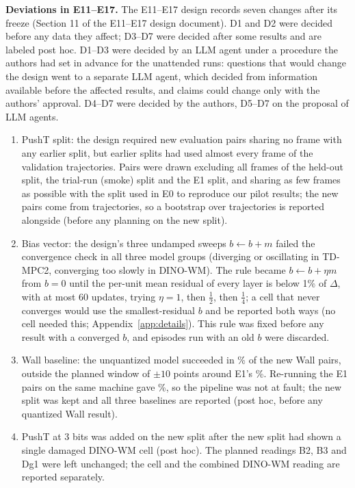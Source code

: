 \textbf{Deviations in E11--E17.} The E11--E17 design records seven changes after its freeze (Section 11 of the E11--E17 design document). D1 and D2 were decided before any data they affect; D3--D7 were decided after some results and are labeled post hoc. D1--D3 were decided by an LLM agent under a procedure the authors had set in advance for the unattended runs: questions that would change the design went to a separate LLM agent, which decided from information available before the affected results, and claims could change only with the authors' approval. D4--D7 were decided by the authors, D5--D7 on the proposal of LLM agents.
\begin{enumerate}\setlength{\itemsep}{0pt}\setlength{\parskip}{0pt}
\item[D1.] PushT split: the design required new evaluation pairs sharing no frame with any earlier split, but earlier splits had used almost every frame of the validation trajectories. Pairs were drawn excluding all frames of the held-out split, the trial-run (smoke) split and the E1 split, and sharing as few frames as possible with the split used in E0 to reproduce our pilot results; the new pairs come from  trajectories, so a bootstrap over trajectories is reported alongside (before any planning on the new split).
\item[D2.] Bias vector: the design's three undamped sweeps $b\leftarrow b+m$ failed the convergence check in all three model groups (diverging or oscillating in TD-MPC2, converging too slowly in DINO-WM). The rule became $b\leftarrow b+\eta m$ from $b=0$ until the per-unit mean residual of every layer is below 1\% of $\Delta$, with at most 60 updates, trying $\eta=1$, then $\tfrac12$, then $\tfrac14$; a cell that never converges would use the smallest-residual $b$ and be reported both ways (no cell needed this; Appendix~\ref{app:details}). This rule was fixed before any \detbc result with a converged $b$, and episodes run with an old $b$ were discarded.
\item[D3.] Wall baseline: the unquantized model succeeded in \% of the new Wall pairs, outside the planned window of $\pm10$ points around E1's \%. Re-running the E1 pairs on the same machine gave \%, so the pipeline was not at fault; the new split was kept and all three baselines are reported (post hoc, before any quantized Wall result).
\item[D4.] PushT at 3 bits was added on the new split after the new split had shown a single damaged DINO-WM cell (post hoc). The planned readings B2, B3 and Dg1 were left unchanged; the cell and the combined DINO-WM reading are reported separately.

\end{enumerate}
